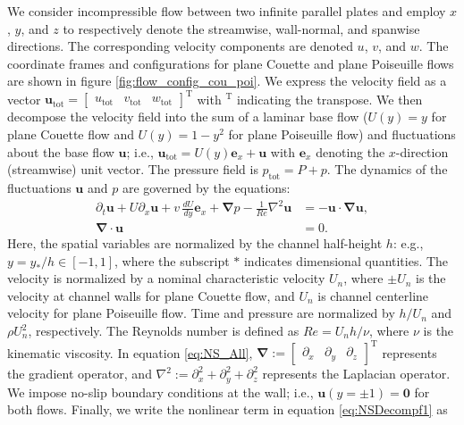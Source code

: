 We consider incompressible flow between two infinite parallel plates and employ $x$, $y$, and $z$ to respectively denote the streamwise, wall-normal, and spanwise directions. The corresponding velocity components are denoted  $u$, $v$, and $w$. The coordinate frames and configurations  for plane Couette and plane Poiseuille flows are shown in figure \ref{fig:flow_config_cou_poi}.
We express the velocity field as a vector $\boldsymbol{u}_{\text{tot}}=\begin{bmatrix}u_{\text{tot}} & v_{\text{tot}} & w_{\text{tot}}\end{bmatrix}^\text{T}$ with $^\text{T}$ indicating the transpose. We then decompose the velocity field into the sum of a laminar base flow ($U(y)=y$ for plane Couette flow and $U(y)=1-y^2$ for plane Poiseuille flow) and fluctuations about the base flow $\boldsymbol{u}$; i.e., $\boldsymbol{u}_{\text{tot}}=U(y)\boldsymbol{e}_x+\boldsymbol{u}$ with $\boldsymbol{e}_x$ denoting the $x$-direction (streamwise) unit vector. The pressure field is  $p_{\text{tot}}=P+p$. The dynamics of the fluctuations $\boldsymbol{u}$ and $p$ are governed by the  equations:
\begin{subequations} \label{eq:NS_All}
\begin{align}
\partial_{t} \boldsymbol{u}  
+  U\partial_x \boldsymbol{u}  + v\,\frac{dU }{dy}\boldsymbol{e}_x +\boldsymbol{\nabla} p
-\frac{1}{Re}{\nabla}^2 \boldsymbol{u}
 &=- \boldsymbol{u} \cdot \boldsymbol{\nabla} \boldsymbol{u}, \label{eq:NSDecompf1} \\
\boldsymbol{\nabla} \cdot \boldsymbol{u}&=0. \label{eq:NSDecompf2}
\end{align}
\end{subequations} 
Here, the spatial variables are normalized by the channel half-height $h$: e.g., $y=y_*/h\in[-1,1]$, where the subscript $*$ indicates dimensional quantities. The velocity is normalized by a nominal characteristic velocity $U_n$, where $\pm U_n$ is the velocity at  channel walls for plane Couette flow, and $U_n$ is  channel centerline velocity for plane Poiseuille flow. Time and pressure are normalized by $h/U_n$ and $\rho U_n^2$, respectively. The Reynolds number is defined as $Re=U_nh/\nu$, where $\nu$ is the kinematic viscosity. In equation \eqref{eq:NS_All},  $\boldsymbol{\nabla}:=\begin{bmatrix}\partial_x & \partial_y & \partial_z\end{bmatrix}^\text{T}$ represents the gradient operator, and $\nabla^2:=\partial_x^2+\partial_y^2+\partial_z^2$ represents the Laplacian operator. We impose no-slip boundary conditions at the wall; i.e., $\boldsymbol{u}(y=\pm 1)=\boldsymbol{0}$ for both flows. Finally, we write the nonlinear term in equation \eqref{eq:NSDecompf1} as
